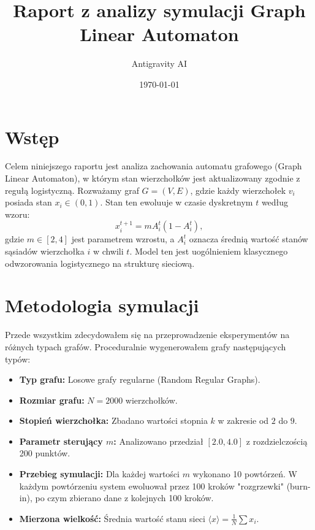 \documentclass{article}
\title{Raport z analizy symulacji Graph Linear Automaton}
\author{Antigravity AI}
\date{\today}
\begin{document}
\maketitle

\section{Wstęp}
Celem niniejszego raportu jest analiza zachowania automatu grafowego (Graph Linear Automaton), w którym stan wierzchołków jest aktualizowany zgodnie z regułą logistyczną. Rozważamy graf $G = (V, E)$, gdzie każdy wierzchołek $v_i$ posiada stan $x_i \in (0, 1)$. Stan ten ewoluuje w czasie dyskretnym $t$ według wzoru:
\begin{equation}
    x_i^{t+1} = m A_i^t (1 - A_i^t),
\end{equation}
gdzie $m \in [2, 4]$ jest parametrem wzrostu, a $A_i^t$ oznacza średnią wartość stanów sąsiadów wierzchołka $i$ w chwili $t$. Model ten jest uogólnieniem klasycznego odwzorowania logistycznego na strukturę sieciową.

\section{Metodologia symulacji}
Przede wszystkim zdecydowałem się na przeprowadzenie eksperymentów na różnych typach grafów. Proceduralnie wygenerowałem grafy następujących typów:
\begin{itemize}
    
\end{itemize} 

\begin{itemize}
    \item \textbf{Typ grafu:} Losowe grafy regularne (Random Regular Graphs).
    \item \textbf{Rozmiar grafu:} $N = 2000$ wierzchołków.
    \item \textbf{Stopień wierzchołka:} Zbadano wartości stopnia $k$ w zakresie od $2$ do $9$.
    \item \textbf{Parametr sterujący $m$:} Analizowano przedział $[2.0, 4.0]$ z rozdzielczością 200 punktów.
    \item \textbf{Przebieg symulacji:} Dla każdej wartości $m$ wykonano 10 powtórzeń. W każdym powtórzeniu system ewoluował przez 100 kroków "rozgrzewki" (burn-in), po czym zbierano dane z kolejnych 100 kroków.
    \item \textbf{Mierzona wielkość:} Średnia wartość stanu sieci $\langle x \rangle = \frac{1}{N} \sum x_i$.
\end{itemize}
\end{document}
